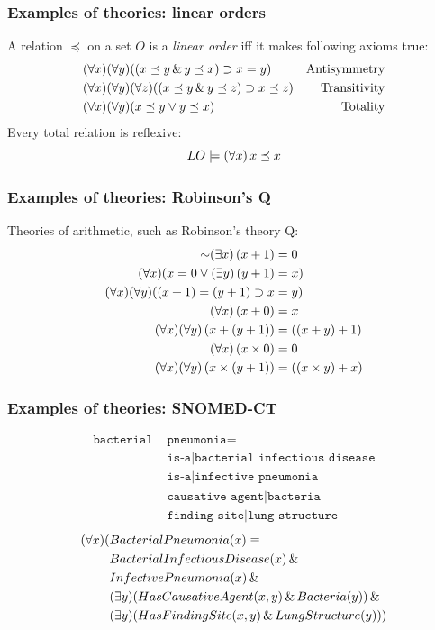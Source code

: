 \begin{frame}
    \frametitle{Examples of theories: linear orders}

A relation $\preceq$ on a set $O$ is a \emph{linear order} iff
it makes following axioms true:
\begin{align*}
& (\forall x)(\forall y)((x \preceq y \,\&\, y \preceq x) \supset x = y) & \text{Antisymmetry}\\
& (\forall x)(\forall y)(\forall z)((x \preceq y \,\&\, y \preceq z) \supset x \preceq z) &\text{Transitivity}\\
& (\forall x)(\forall y)(x \preceq y \vee y \preceq x) & \text{Totality}
\end{align*}
Every total relation is reflexive:
\[
{ LO} \models (\forall x)\, x \preceq x
\]
\end{frame}

\begin{frame}
    \frametitle{Examples of theories: Robinson's Q}

Theories of arithmetic, such as Robinson's theory Q:
\begin{align*}
 \lnot\qt{\exists}{x}\, (x + 1) & = 0\\
 \qt{\forall}{x}(x = 0  \lor \qt{\exists}{y}\, (y+1) & = x)\\
 \qt{\forall}{x}\qt{\forall}{y}((x + 1) = (y + 1)  \to x & = y)\\
 \qt{\forall}{x}\,(x + 0) & = x\\
 \qt{\forall}{x}\qt{\forall}{y}\, (x + (y+1)) & = ((x + y) +1) \\
 \qt{\forall}{x}\,(x \times 0) & = 0\\
 \qt{\forall}{x}\qt{\forall}{y}\, (x \times (y + 1)) & = ((x \times y) + x)
\end{align*}
\end{frame}



\begin{frame}
    \frametitle{Examples of theories: SNOMED-CT}

\begin{align*}
\texttt{bacterial } & \texttt{pneumonia} = \\
& \texttt{is-a|bacterial infectious disease}\\
& \texttt{is-a|infective pneumonia}\\
& \texttt{causative agent|bacteria}\\
& \texttt{finding site|lung structure}
\end{align*}
\begin{align*}
(\forall x)(& BacterialPneumonia(x) \equiv  \\
& BacterialInfectiousDisease(x) \,\&\,\\
& InfectivePneumonia(x) \,\&\, \\
& (\exists y)(HasCausativeAgent(x, y) \,\&\, Bacteria(y)) \,\&\,\\
&(\exists y)(HasFindingSite(x, y) \,\&\, LungStructure(y)))
\end{align*}
\end{frame}

